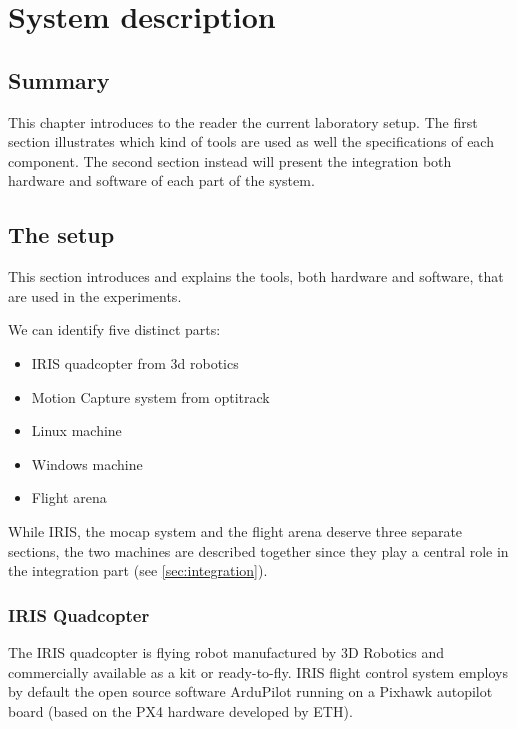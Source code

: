 
\chapter{System description}
\label{chap:third}
\ifpdf
    \graphicspath{{Chapter3/Figures/PNG/}{Chapter3/Figures/PDF/}{Chapter3/Figures/}}
\else
    \graphicspath{{Chapter3/Figures/EPS/}{Chapter3/Figures/}}
\fi

\section*{Summary}

This chapter introduces to the reader the current laboratory setup. The first section illustrates which kind of tools are used as well the specifications of each component. The second section instead will present the integration both hardware and software of each part of the system. 

\section{The setup}
\label{sec:setup}
This section introduces and explains the tools, both hardware and software, that are used in the experiments. 

We can identify five distinct parts:
\begin{itemize}
\item  IRIS quadcopter from 3d robotics
\item  Motion Capture system from optitrack
\item  Linux machine
\item  Windows machine
\item  Flight arena
\end{itemize}
While IRIS, the mocap system and the flight arena deserve three separate sections, the two machines are described together since they play a central role in the integration part (see \ref{sec:integration}).

\subsection{IRIS Quadcopter}

The IRIS quadcopter is flying robot manufactured by 3D Robotics and commercially available as a kit or ready-to-fly. IRIS flight control system employs by default the open source software ArduPilot running on a Pixhawk autopilot board (based on the PX4 hardware developed by ETH).

